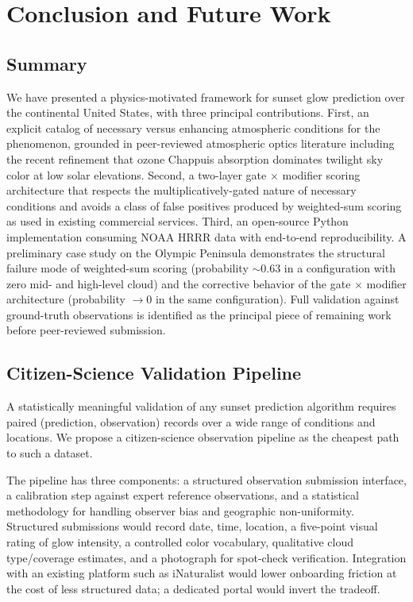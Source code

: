 \documentclass[11pt,a4paper]{article}
\begin{document}
\section{Conclusion and Future Work}
\label{sec:conclusion}

\subsection{Summary}

We have presented a physics-motivated framework for sunset glow prediction over the continental United States, with three principal contributions. First, an explicit catalog of necessary versus enhancing atmospheric conditions for the phenomenon, grounded in peer-reviewed atmospheric optics literature including the recent \citet{lange2023revisiting} refinement that ozone Chappuis absorption dominates twilight sky color at low solar elevations. Second, a two-layer gate $\times$ modifier scoring architecture that respects the multiplicatively-gated nature of necessary conditions and avoids a class of false positives produced by weighted-sum scoring as used in existing commercial services. Third, an open-source Python implementation consuming NOAA HRRR data with end-to-end reproducibility. A preliminary case study on the Olympic Peninsula demonstrates the structural failure mode of weighted-sum scoring (probability $\sim 0.63$ in a configuration with zero mid- and high-level cloud) and the corrective behavior of the gate $\times$ modifier architecture (probability $\to 0$ in the same configuration). Full validation against ground-truth observations is identified as the principal piece of remaining work before peer-reviewed submission.

\subsection{Citizen-Science Validation Pipeline}
\label{sec:validation}

A statistically meaningful validation of any sunset prediction algorithm requires paired (prediction, observation) records over a wide range of conditions and locations. We propose a citizen-science observation pipeline as the cheapest path to such a dataset.

The pipeline has three components: a structured observation submission interface, a calibration step against expert reference observations, and a statistical methodology for handling observer bias and geographic non-uniformity. Structured submissions would record date, time, location, a five-point visual rating of glow intensity, a controlled color vocabulary, qualitative cloud type/coverage estimates, and a photograph for spot-check verification. Integration with an existing platform such as iNaturalist would lower onboarding friction at the cost of less structured data; a dedicated portal would invert the tradeoff.
\end{document}
